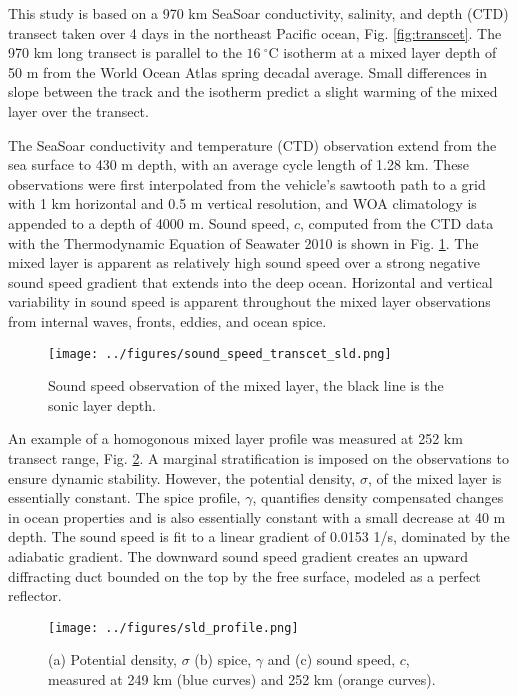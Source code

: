 \documentclass[preprint,NumberedRefs]{JASA}
\begin{document}
This study is based on a 970 km SeaSoar conductivity, salinity, and depth (CTD) transect taken over 4 days in the northeast Pacific ocean\citep{cole2010seasonal}, Fig. \ref{fig:transcet}. The 970 km long transect is parallel to the $16 \ ^\circ$C isotherm at a mixed layer depth of 50 m from the World Ocean Atlas spring decadal average\citep{WOA}. Small differences in slope between the track and the isotherm predict a slight warming of the mixed layer over the transect.

The SeaSoar conductivity and temperature (CTD) observation\citep{colosi2020observations} extend from the sea surface to 430 m depth, with an average cycle length of 1.28 km. These observations were first interpolated from the vehicle's sawtooth path to a grid with 1 km horizontal and 0.5 m vertical resolution, and WOA climatology is appended to a depth of 4000 m\citep{WOA}. Sound speed, $c$, computed from the CTD data with the Thermodynamic Equation of Seawater 2010 is shown in Fig. \ref{fig:c_grid}. The mixed layer is apparent as relatively high sound speed over a strong negative sound speed gradient that extends into the deep ocean. Horizontal and vertical variability in sound speed is apparent throughout the mixed layer observations from internal waves, fronts, eddies, and ocean spice\citep{colosi2020observations}.

\begin{figure}
\texttt{[image: ../figures/sound\_speed\_transcet\_sld.png]}
\caption{\label{fig:c_grid}{Sound speed observation of the mixed layer, the black line is the sonic layer depth.}}
\end{figure}

An example of a homogonous mixed layer profile was measured at 252 km transect range, Fig. \ref{fig:profiles}. A marginal stratification is imposed on the observations to ensure dynamic stability\citep{barker2017stabilizing}. However, the potential density, $\sigma$, of the mixed layer is essentially constant. The spice profile, $\gamma$, quantifies density compensated changes in ocean properties and is also essentially constant with a small decrease at 40 m depth. The sound speed is fit to a linear gradient of 0.0153 1/s, dominated by the adiabatic gradient. The downward sound speed gradient creates an upward diffracting duct bounded on the top by the free surface, modeled as a perfect reflector.

\begin{figure}
\texttt{[image: ../figures/sld\_profile.png]}
    \caption{\label{fig:profiles}{(a) Potential density, $\sigma$ (b) spice, $\gamma$ and (c) sound speed, $c$, measured at 249 km (blue curves) and 252 km (orange curves).}}
\end{figure}
\end{document}

